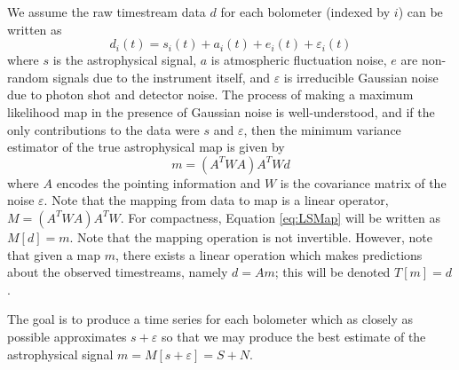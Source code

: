 \documentclass[12pt,preprint]{aastex}
\newcommand{\epsi}{\varepsilon}
\begin{document}
We assume the raw timestream data $d$ for each bolometer (indexed by
$i$) can be written as
\begin{equation}
d_i(t) = s_i(t)+a_i(t)+e_i(t)+\epsi_i(t)
\end{equation}
where $s$ is the astrophysical signal, $a$ is atmospheric fluctuation
noise, $e$ are non-random signals due to the instrument itself, and
$\epsi$ is irreducible Gaussian noise due to photon shot and detector
noise.  The process of making a maximum likelihood map in the presence
of Gaussian noise is well-understood, and if the only contributions to
the data were $s$ and $\epsi$, then the minimum variance estimator of
the true astrophysical map is given by
\begin{equation}
\label{eq:LSMap}
m = (A^T W A) A^T W d
\end{equation}
where $A$ encodes the pointing information and $W$ is the covariance
matrix of the noise $\epsi$.  Note that the mapping from data to map
is a linear operator, $M =(A^T W A) A^T W$.  For compactness, Equation
\ref{eq:LSMap} will be written as $M[d] = m$.  Note that the mapping
operation is not invertible.  However, note that given a map $m$,
there exists a linear operation which makes predictions about the
observed timestreams, namely $d = A m$; this will be denoted $T[m] =
d$.

The goal is to produce a time series for each bolometer which as
closely as possible approximates $s + \epsi$ so that we may produce
the best estimate of the astrophysical signal $m = M[s+\epsi] = S + N$.
\end{document}
